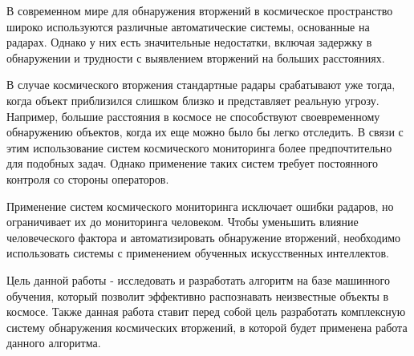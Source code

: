 \begin{introduction}
  В современном мире для обнаружения вторжений в космическое пространство широко используются различные автоматические системы, основанные на радарах. Однако у них есть значительные недостатки, включая задержку в обнаружении и трудности с выявлением вторжений на больших расстояниях.

  В случае космического вторжения стандартные радары срабатывают уже тогда, когда объект приблизился слишком близко и представляет реальную угрозу. Например, большие расстояния в космосе не способствуют своевременному обнаружению объектов, когда их еще можно было бы легко отследить. В связи с этим использование систем космического мониторинга более предпочтительно для подобных задач. Однако применение таких систем требует постоянного контроля со стороны операторов.

  Применение систем космического мониторинга исключает ошибки радаров, но ограничивает их до мониторинга человеком. Чтобы уменьшить влияние человеческого фактора и автоматизировать обнаружение вторжений, необходимо использовать системы с применением обученных искусственных интеллектов.

  Цель данной работы - исследовать и разработать алгоритм на базе машинного обучения, который позволит эффективно распознавать неизвестные объекты в космосе. Также данная работа ставит перед собой цель разработать комплексную систему обнаружения космических вторжений, в которой будет применена работа данного алгоритма.
\end{introduction}